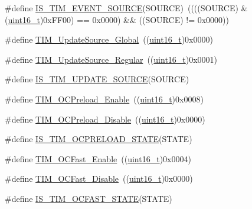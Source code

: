 \begin{DoxyCompactItemize}
\#define \hyperlink{group___t_i_m___event___source_ga4ac88c3e43c8250114ea81a6e052d58a}{I\+S\+\_\+\+T\+I\+M\+\_\+\+E\+V\+E\+N\+T\+\_\+\+S\+O\+U\+R\+CE}(S\+O\+U\+R\+CE)~((((S\+O\+U\+R\+CE) \& (\hyperlink{_p_e___types_8h_a1f1825b69244eb3ad2c7165ddc99c956}{uint16\+\_\+t})0x\+F\+F00) == 0x0000) \&\& ((\+S\+O\+U\+R\+C\+E) != 0x0000))
\item 
\#define \hyperlink{group___t_i_m___update___source_ga32c67bc3f8211a2c7b44ee9fe1523875}{T\+I\+M\+\_\+\+Update\+Source\+\_\+\+Global}~((\hyperlink{_p_e___types_8h_a1f1825b69244eb3ad2c7165ddc99c956}{uint16\+\_\+t})0x0000)
\item 
\#define \hyperlink{group___t_i_m___update___source_ga6f50423cdb011137ae8cd303ccd2080c}{T\+I\+M\+\_\+\+Update\+Source\+\_\+\+Regular}~((\hyperlink{_p_e___types_8h_a1f1825b69244eb3ad2c7165ddc99c956}{uint16\+\_\+t})0x0001)
\item 
\#define \hyperlink{group___t_i_m___update___source_ga7c916798d8f5f4a828afadceb5d38a95}{I\+S\+\_\+\+T\+I\+M\+\_\+\+U\+P\+D\+A\+T\+E\+\_\+\+S\+O\+U\+R\+CE}(S\+O\+U\+R\+CE)
\item 
\#define \hyperlink{group___t_i_m___output___compare___preload___state_gad647db2e7a89bd6db3c787680afccf8f}{T\+I\+M\+\_\+\+O\+C\+Preload\+\_\+\+Enable}~((\hyperlink{_p_e___types_8h_a1f1825b69244eb3ad2c7165ddc99c956}{uint16\+\_\+t})0x0008)
\item 
\#define \hyperlink{group___t_i_m___output___compare___preload___state_ga0cbcc3c4d90d61d85550db2173737ed6}{T\+I\+M\+\_\+\+O\+C\+Preload\+\_\+\+Disable}~((\hyperlink{_p_e___types_8h_a1f1825b69244eb3ad2c7165ddc99c956}{uint16\+\_\+t})0x0000)
\item 
\#define \hyperlink{group___t_i_m___output___compare___preload___state_ga48cc07c5e87b5fd7549b7668f1598ab5}{I\+S\+\_\+\+T\+I\+M\+\_\+\+O\+C\+P\+R\+E\+L\+O\+A\+D\+\_\+\+S\+T\+A\+TE}(S\+T\+A\+TE)
\item 
\#define \hyperlink{group___t_i_m___output___compare___fast___state_ga0cfb598c985363ee7004e52c97c524a3}{T\+I\+M\+\_\+\+O\+C\+Fast\+\_\+\+Enable}~((\hyperlink{_p_e___types_8h_a1f1825b69244eb3ad2c7165ddc99c956}{uint16\+\_\+t})0x0004)
\item 
\#define \hyperlink{group___t_i_m___output___compare___fast___state_gab3d39f8797953cb58754205169d8278e}{T\+I\+M\+\_\+\+O\+C\+Fast\+\_\+\+Disable}~((\hyperlink{_p_e___types_8h_a1f1825b69244eb3ad2c7165ddc99c956}{uint16\+\_\+t})0x0000)
\item 
\#define \hyperlink{group___t_i_m___output___compare___fast___state_ga65ad85cb4ba48660e8f519a1f6c298d2}{I\+S\+\_\+\+T\+I\+M\+\_\+\+O\+C\+F\+A\+S\+T\+\_\+\+S\+T\+A\+TE}(S\+T\+A\+TE)

\end{DoxyCompactItemize}
